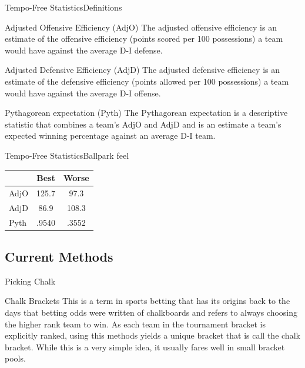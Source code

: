\documentclass{beamer}
\begin{document}
\begin{frame}{Tempo-Free Statistics}{Definitions}
\begin{block}{Adjusted Offensive Efficiency (AdjO)}
The adjusted offensive efficiency is an estimate of the offensive efficiency (points scored per 100 possessions) a team would have against the \newline average D-I defense.
\end{block}
\begin{block}{Adjusted Defensive Efficiency (AdjD)}
The adjusted defensive efficiency is an estimate of the defensive efficiency (points allowed per 100 possessions) a team would have against the average D-I offense.
\end{block}
\begin{block}{Pythagorean expectation (Pyth)}
The Pythagorean expectation is a descriptive statistic that combines a team's AdjO and AdjD and is an estimate a team’s expected winning percentage against an average D-I team.
\end{block} 
\end{frame}

\begin{frame}{Tempo-Free Statistics}{Ballpark feel}
\huge
\begin{table}[h]
\begin{tabular}{l|c|c|}
\cline{2-3}
                           & Best  & Worse \\ \hline
\multicolumn{1}{|l|}{AdjO} & 125.7 & 97.3  \\ \hline
\multicolumn{1}{|l|}{AdjD} & 86.9  & 108.3 \\ \hline
\multicolumn{1}{|l|}{Pyth} & .9540 & .3552 \\ \hline
\end{tabular}
\end{table}
\end{frame}

\subsection{Current Methods}

\begin{frame}{Picking Chalk}
\begin{block}{Chalk Brackets}
This is a term in sports betting that has its origins back to the days that betting odds were written of chalkboards and refers to always choosing the higher rank team to win. As each team in the tournament bracket is explicitly ranked, using this methods yields a unique bracket that is call the chalk bracket. While this is a very simple idea, it usually fares well in small bracket pools.
\end{block} 
\end{frame}
\end{document}
